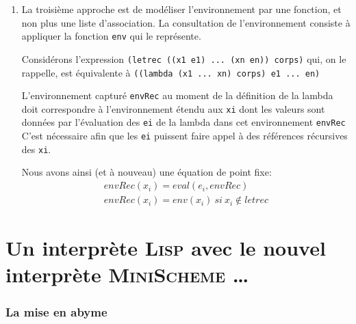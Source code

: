 \begin{enumerate}
\begin{verbatim}
(define F*
  (lambda (f)
    (lambda (n)
      (if (eq? n 0)
          1
          (* n (f (- n 1)))))))
          
 (define fact (Y F*))
\end{verbatim}
  
  \item La troisième approche est de modéliser l'environnement par une fonction, et non plus une liste d'association.
  La consultation de l'environnement consiste \`{a} appliquer la fonction \verb+env+ qui le repr\'{e}sente.

  Considérons l'expression \texttt{(letrec ((x1 e1) ... (xn en)) corps)}  qui, on le rappelle, est \'{e}quivalente à 
  \texttt{((lambda (x1 ... xn) corps) e1 ... en)}
  
  L'environnement capturé \verb+envRec+ au moment de la définition de la lambda  doit correspondre à 
  l'environnement étendu aux \verb+xi+ dont les valeurs sont données par l'évaluation des \verb+ei+ de la lambda 
  dans cet environnement \verb+envRec+
  C'est nécessaire afin que les \verb+ei+ puissent faire appel à des références récursives des \verb+xi+.
  
  Nous avons ainsi (et à nouveau) une équation de point fixe:
\[
  \begin{array}{l}
    envRec(x_i) = eval (e_i, envRec) \\
    envRec(x_i) = env (x_i) \ si \ x_i \notin letrec
  \end{array}
\]
  
\end{enumerate}

\section{Un interprète \textsc{Lisp} avec le nouvel interprète \textsc{MiniScheme} \ldots}
\subsubsection{La mise en abyme}


